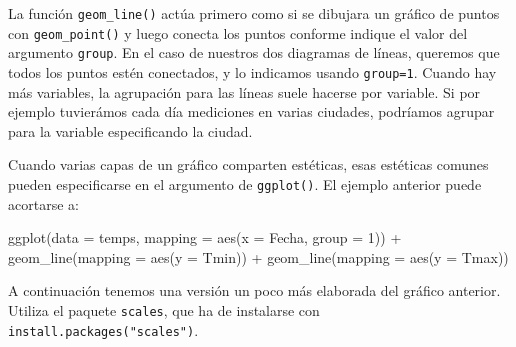 \documentclass[
  title=normal,
  notoc,
  bib=normal]{mnye}
\newenvironment{Shaded}{\begin{snugshade}}{\end{snugshade}}
\newcommand{\AttributeTok}[1]{\textcolor[rgb]{0.77,0.63,0.00}{#1}}
\newcommand{\DecValTok}[1]{\textcolor[rgb]{0.00,0.00,0.81}{#1}}
\newcommand{\FunctionTok}[1]{\textcolor[rgb]{0.00,0.00,0.00}{#1}}
\newcommand{\NormalTok}[1]{#1}
\newcommand{\SpecialCharTok}[1]{\textcolor[rgb]{0.00,0.00,0.00}{#1}}
\begin{document}
La función \texttt{geom\_line()} actúa primero como si se dibujara un gráfico de puntos con \texttt{geom\_point()} y luego conecta los puntos conforme indique el valor del argumento \texttt{group}. En el caso de nuestros dos diagramas de líneas, queremos que todos los puntos estén conectados, y lo indicamos usando \texttt{group=1}. Cuando hay más variables, la agrupación para las líneas suele hacerse por variable. Si por ejemplo tuvierámos cada día mediciones en varias ciudades, podríamos agrupar para la variable especificando la ciudad.

Cuando varias capas de un gráfico comparten estéticas, esas estéticas comunes pueden especificarse en el argumento de \texttt{ggplot()}. El ejemplo anterior puede acortarse a:

\begin{Shaded}
\begin{Highlighting}[]
\FunctionTok{ggplot}\NormalTok{(}\AttributeTok{data =}\NormalTok{ temps, }\AttributeTok{mapping =} \FunctionTok{aes}\NormalTok{(}\AttributeTok{x =}\NormalTok{ Fecha, }\AttributeTok{group =} \DecValTok{1}\NormalTok{)) }\SpecialCharTok{+} 
    \FunctionTok{geom\_line}\NormalTok{(}\AttributeTok{mapping =} \FunctionTok{aes}\NormalTok{(}\AttributeTok{y =}\NormalTok{ Tmin)) }\SpecialCharTok{+} 
    \FunctionTok{geom\_line}\NormalTok{(}\AttributeTok{mapping =} \FunctionTok{aes}\NormalTok{(}\AttributeTok{y =}\NormalTok{ Tmax)) }
\end{Highlighting}
\end{Shaded}

A continuación tenemos una versión un poco más elaborada del gráfico anterior. Utiliza el paquete \texttt{scales}, que ha de instalarse con \texttt{install.packages("scales")}.
\end{document}
